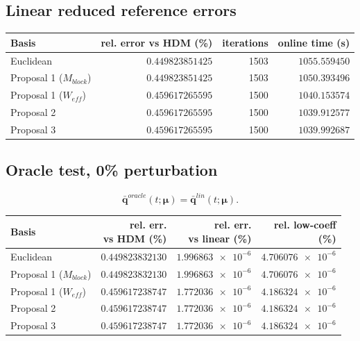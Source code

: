 \documentclass[11pt]{article}
\begin{document}
\subsection*{Linear reduced reference errors}
\begin{longtable}{lrrr}
\toprule
Basis & rel. error vs HDM (\%) & iterations & online time (s) \\
\midrule
Euclidean & \(\num{0.449823851425}\) & 1503 & \(\num{1055.559450}\) \\
Proposal 1 (\(M_{block}\)) & \(\num{0.449823851425}\) & 1503 & \(\num{1050.393496}\) \\
Proposal 1 (\(W_{eff}\)) & \(\num{0.459617265595}\) & 1500 & \(\num{1040.153574}\) \\
Proposal 2 & \(\num{0.459617265595}\) & 1500 & \(\num{1039.912577}\) \\
Proposal 3 & \(\num{0.459617265595}\) & 1500 & \(\num{1039.992687}\) \\
\bottomrule
\end{longtable}

\subsection*{Oracle test, 0\% perturbation}
\[
\bar{\mathbf q}^{oracle}(t;\bm\mu)=\bar{\mathbf q}^{lin}(t;\bm\mu).
\]
\begin{longtable}{lrrr}
\toprule
Basis &
\makecell[c]{rel. err.\\vs HDM (\%)} &
\makecell[c]{rel. err.\\vs linear (\%)} &
\makecell[c]{rel. low-coeff\\(\%)} \\
\midrule
Euclidean & \(\num{0.449823832130}\) & \(\num{1.996863e-6}\) & \(\num{4.706076e-6}\) \\
Proposal 1 (\(M_{block}\)) & \(\num{0.449823832130}\) & \(\num{1.996863e-6}\) & \(\num{4.706076e-6}\) \\
Proposal 1 (\(W_{eff}\)) & \(\num{0.459617238747}\) & \(\num{1.772036e-6}\) & \(\num{4.186324e-6}\) \\
Proposal 2 & \(\num{0.459617238747}\) & \(\num{1.772036e-6}\) & \(\num{4.186324e-6}\) \\
Proposal 3 & \(\num{0.459617238747}\) & \(\num{1.772036e-6}\) & \(\num{4.186324e-6}\) \\
\bottomrule
\end{longtable}
\end{document}
